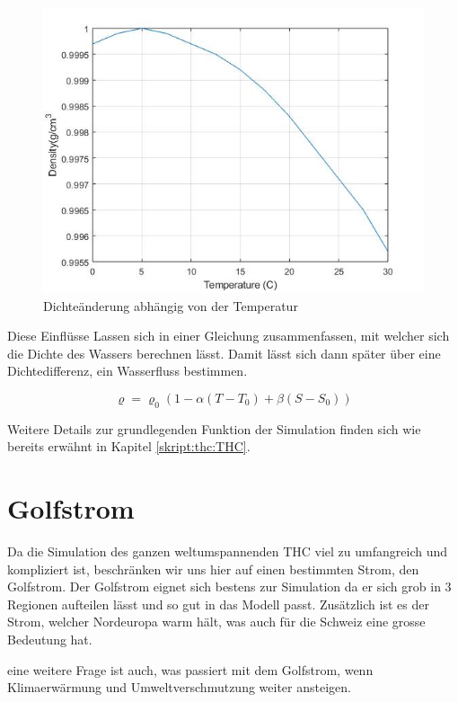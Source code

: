 \begin{figure}
	\centering
	\includegraphics[width=12cm]{thermohalin/Code/graphs/graph_temp.jpg}
	\caption{Dichteänderung abhängig von der Temperatur}
\end{figure}

 Diese Einflüsse Lassen sich in einer Gleichung zusammenfassen, mit welcher sich die Dichte des Wassers berechnen lässt. Damit lässt sich dann später über eine Dichtedifferenz, ein Wasserfluss bestimmen.
 

\begin{equation}
\varrho
=
\varrho_0(1-\alpha(T-T_0)+\beta(S-S_0))
\label{skript:salinity-linear}
\end{equation} 

Weitere Details zur grundlegenden Funktion der Simulation finden sich wie bereits erwähnt in Kapitel \ref{skript:thc:THC}.


\section{Golfstrom}

Da die Simulation des ganzen weltumspannenden THC viel zu umfangreich und kompliziert ist, beschränken wir uns hier auf einen bestimmten Strom, den Golfstrom.
Der Golfstrom eignet sich bestens zur Simulation da er sich grob in 3 Regionen aufteilen lässt und so gut in das Modell passt. Zusätzlich ist es der Strom, welcher Nordeuropa warm hält, was auch für die Schweiz eine grosse Bedeutung hat.

eine weitere Frage ist auch, was passiert mit dem Golfstrom, wenn Klimaerwärmung und Umweltverschmutzung weiter ansteigen.


